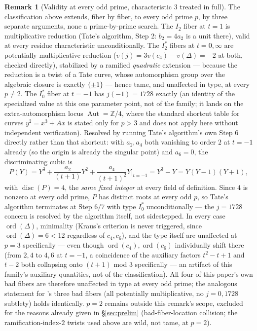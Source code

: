 \documentclass[11pt]{amsart}
\theoremstyle{definition}
\newtheorem{remark}[theorem]{Remark}
\newcommand{\Z}{\mathbb{Z}}
\begin{document}
\begin{remark}[Validity at every odd prime, characteristic $3$ treated in full]
\label{rem:char-p}
The classification above extends, fiber by fiber, to every odd prime $p$, by three separate arguments, none a prime-by-prime search. The $I_2$ fiber at $t=1$ is multiplicative reduction (Tate's algorithm, Step 2: $b_2=4a_2$ is a unit there), valid at every residue characteristic unconditionally. The $I_2^*$ fibers at $t=0,\infty$ are potentially multiplicative reduction ($v(j)=3v(c_4)-v(\Delta)=-2$ at both, checked directly), stabilized by a ramified \emph{quadratic} extension — because the reduction is a twist of a Tate curve, whose automorphism group over the algebraic closure is exactly $\{\pm1\}$ — hence tame, and unaffected in type, at every $p\ne2$. The $I_0^*$ fiber at $t=-1$ has $j(-1)=1728$ exactly (an identity of the specialized value at this one parameter point, not of the family; it lands on the extra-automorphism locus $\operatorname{Aut}=\Z/4$, where the standard shortcut table for curves $y^2=x^3+Ax$ is stated only for $p>3$ and does not apply here without independent verification). Resolved by running Tate's algorithm's own Step $6$ directly rather than that shortcut: with $a_2,a_4$ both vanishing to order $2$ at $t=-1$ already (so the origin is already the singular point) and $a_6=0$, the discriminating cubic is
\[
P(Y)=Y^3+\frac{a_2}{(t+1)}Y^2+\frac{a_4}{(t+1)^2}Y\Bigg|_{t=-1}=Y^3-Y=Y(Y-1)(Y+1),
\]
with $\operatorname{disc}(P)=4$, the \emph{same fixed integer} at every field of definition. Since $4$ is nonzero at every odd prime, $P$ has distinct roots at every odd $p$, so Tate's algorithm terminates at Step $6/7$ with type $I_0^*$ unconditionally — the $j=1728$ concern is resolved by the algorithm itself, not sidestepped. In every case $\operatorname{ord}(\Delta)$, minimality (Kraus's criterion is never triggered, since $\operatorname{ord}(\Delta)=6<12$ regardless of $c_4,c_6$), and the type itself are unaffected at $p=3$ specifically — even though $\operatorname{ord}(c_4),\operatorname{ord}(c_6)$ individually shift there (from $2,4$ to $4,6$ at $t=-1$, a coincidence of the auxiliary factors $t^2{-}t{+}1$ and $t{-}2$ both collapsing onto $(t{+}1)$ mod $3$ specifically — an artifact of this family's auxiliary quantities, not of the classification). All four of this paper's own bad fibers are therefore unaffected in type at every odd prime; the analogous statement for \cite{ClassIII}'s three bad fibers (all potentially multiplicative, no $j=0,1728$ subtlety) holds identically. $p=2$ remains outside this remark's scope, excluded for the reasons already given in \S\ref{sec:prelim} (bad-fiber-location collision; the ramification-index-$2$ twists used above are wild, not tame, at $p=2$).
\end{remark}
\end{document}
